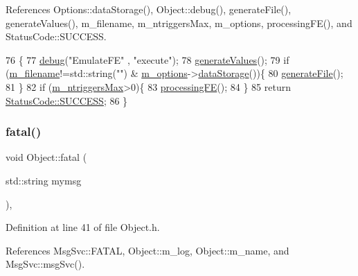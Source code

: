 References Options\+::data\+Storage(), Object\+::debug(), generate\+File(), generate\+Values(), m\+\_\+filename, m\+\_\+ntriggers\+Max, m\+\_\+options, processing\+F\+E(), and Status\+Code\+::\+S\+U\+C\+C\+E\+SS.


\begin{DoxyCode}
76                                 \{
77   \hyperlink{classObject_aac010553f022165573714b7014a15f0d}{debug}(\textcolor{stringliteral}{"EmulateFE"} , \textcolor{stringliteral}{"execute"});
78   \hyperlink{classEmulateFE_ae557d3569b9285a871c502b93ba20494}{generateValues}();
79   \textcolor{keywordflow}{if} (\hyperlink{classEmulateFE_a103fedea9eb5d3963573f9120cb81a68}{m\_filename}!=std::string(\textcolor{stringliteral}{""}) & \hyperlink{classEmulateFE_a2f2da7d4b2164c47673a6ecc6dcef1ea}{m\_options}->\hyperlink{classOptions_aed7799d10139fa542055b982cb820192}{dataStorage}())\{
80     \hyperlink{classEmulateFE_ae62bc56b44c4bcdf7f5eab5cbde2cd69}{generateFile}();
81   \}
82   \textcolor{keywordflow}{if} (\hyperlink{classEmulateFE_a2d473d12faf30f4870458874d70c7f55}{m\_ntriggersMax}>0)\{
83     \hyperlink{classEmulateFE_adf7213a308c8a04f4d7efbb86a13689e}{processingFE}();
84   \}
85   \textcolor{keywordflow}{return} \hyperlink{classStatusCode_a6f565cbeadc76d14c72f047e5e85eb4badd0da38d3ba0d922efd1f4619bc37ad8}{StatusCode::SUCCESS};
86 \}
\end{DoxyCode}
\mbox{\label{classObject_aad5a16aac7516ce65bd5ec02ab07fc80}} 
\subsubsection{\texorpdfstring{fatal()}{fatal()}\hspace{0.1cm}{\footnotesize\ttfamily [1/2]}}
{\footnotesize\ttfamily void Object\+::fatal (\begin{DoxyParamCaption}\item[{std\+::string}]{mymsg }\end{DoxyParamCaption})\hspace{0.3cm}{\ttfamily [inline]}, {\ttfamily [inherited]}}



Definition at line 41 of file Object.\+h.



References Msg\+Svc\+::\+F\+A\+T\+AL, Object\+::m\+\_\+log, Object\+::m\+\_\+name, and Msg\+Svc\+::msg\+Svc().



